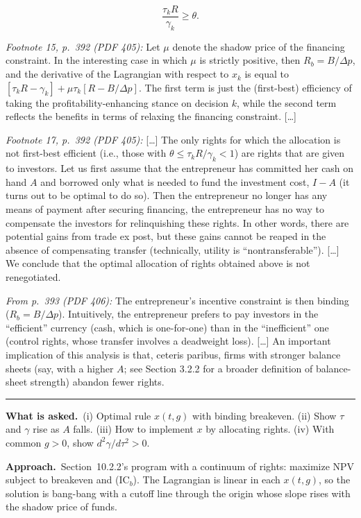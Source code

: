 \documentclass[11pt,a4paper]{article}
\newcommand{\asked}{\par\medskip\noindent\textbf{What is asked.}~}
\newcommand{\approach}{\par\smallskip\noindent\textbf{Approach.}~}
\newcommand{\stmtend}{\par\endgroup\nopagebreak\noindent\rule{\linewidth}{0.4pt}\par\medskip}
\begin{document}
\[\frac{\tau_k R}{\gamma_k} \geqslant \theta.\]

\emph{Footnote 15, p.~392 (PDF 405):} Let \(\mu\) denote the shadow price of the financing
constraint. In the interesting case in which \(\mu\) is strictly positive, then
\(R_b = B/\Delta p\), and the derivative of the Lagrangian with respect to \(x_k\) is equal to
\([\tau_k R - \gamma_k] + \mu\tau_k[R - B/\Delta p]\). The first term is just the (first-best)
efficiency of taking the profitability-enhancing stance on decision \(k\), while the second term
reflects the benefits in terms of relaxing the financing constraint. {[}\ldots{]}

\emph{Footnote 17, p.~392 (PDF 405):} {[}\ldots{]} The only rights for which the allocation is not
first-best efficient (i.e., those with \(\theta \leqslant \tau_k R/\gamma_k < 1\)) are rights that
are given to investors. Let us first assume that the entrepreneur has committed her cash on hand
\(A\) and borrowed only what is needed to fund the investment cost, \(I - A\) (it turns out to be
optimal to do so). Then the entrepreneur no longer has any means of payment after securing
financing, the entrepreneur has no way to compensate the investors for relinquishing these rights.
In other words, there are potential gains from trade ex post, but these gains cannot be reaped in
the absence of compensating transfer (technically, utility is ``nontransferable''). {[}\ldots{]} We
conclude that the optimal allocation of rights obtained above is not renegotiated.

\emph{From p.~393 (PDF 406):} The entrepreneur's incentive constraint is then binding
(\(R_b = B/\Delta p\)). Intuitively, the entrepreneur prefers to pay investors in the ``efficient''
currency (cash, which is one-for-one) than in the ``inefficient'' one (control rights, whose
transfer involves a deadweight loss). {[}\ldots{]} An important implication of this analysis is
that, ceteris paribus, firms with stronger balance sheets (say, with a higher \(A\); see Section
3.2.2 for a broader definition of balance-sheet strength) abandon fewer rights.
\stmtend

\asked (i) Optimal rule $x(t,g)$ with binding breakeven. (ii) Show $\tau$ and $\gamma$ rise as $A$ falls. (iii) How to implement $x$ by allocating rights. (iv) With common $g>0$, show $d^2\gamma/d\tau^2>0$.

\approach Section~10.2.2's program with a continuum of rights: maximize NPV subject to breakeven and (IC$_b$). The Lagrangian is linear in each $x(t,g)$, so the solution is bang-bang with a cutoff line through the origin whose slope rises with the shadow price of funds.
\end{document}
